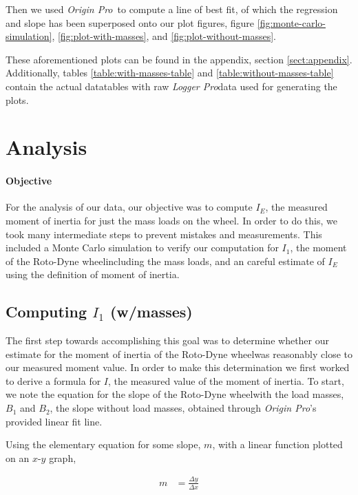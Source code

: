 \documentclass[coverpage]{article}
\newcommand{\softwareText}[1]{\textit{#1}\texttrademark}
\newcommand{\loggerpro}{\softwareText{Logger Pro}}
\newcommand{\origin}{\softwareText{Origin Pro}}
\newcommand{\rwheel}{Roto-Dyne wheel}
\begin{document}
	Then we used \origin~to compute a line of best fit, of which the regression and slope has been superposed onto our plot figures, figure \ref{fig:monte-carlo-simulation}, \ref{fig:plot-with-masses}, and \ref{fig:plot-without-masses}.
	
	These aforementioned plots can be found in the appendix, section \ref{sect:appendix}. Additionally, tables \ref{table:with-masses-table} and \ref{table:without-masses-table} contain the actual datatables with raw \loggerpro data used for generating the plots.
	
	\section{Analysis}
	
	\paragraph{Objective}
	
	For the analysis of our data, our objective was to compute $I_E$, the measured moment of inertia for just the mass loads on the wheel. In order to do this, we took many intermediate steps to prevent mistakes and measurements. This included a Monte Carlo simulation to verify our computation for $I_1$, the moment of the \rwheel including the mass loads, and an careful estimate of $I_E$ using the definition of moment of inertia. 
	
	\subsection{Computing $I_1$ (w/masses)}
	
	The first step towards accomplishing this goal was to determine whether our estimate for the moment of inertia of the \rwheel was reasonably close to our measured moment value. In order to make this determination we first worked to derive a formula for $I$, the measured value of the moment of inertia. To start, we note the equation for the slope of the \rwheel with the load masses, $B_1$ and $B_2$, the slope without load masses, obtained through \origin's provided linear fit line.
	
	Using the elementary equation for some slope, $m$, with a linear function plotted on an $x$-$y$ graph,
	
	\begin{align}
		m &= \frac{\Delta{y}}{\Delta{x}}
	\end{align}
\end{document}
